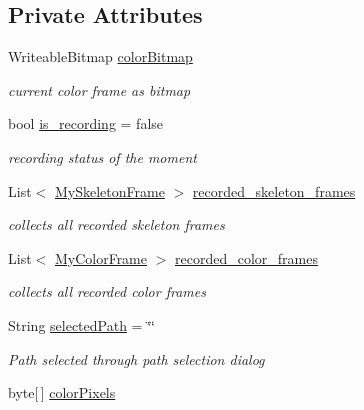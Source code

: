 \subsection*{Private Attributes}
\begin{DoxyCompactItemize}
\item 
Writeable\-Bitmap \hyperlink{classUTKinectSkeletonMovementDetector_1_1MainWindow_a6518d4a9f673ea5af3a052cf1b31043b}{color\-Bitmap}
\begin{DoxyCompactList}\small\item\em current color frame as bitmap \end{DoxyCompactList}\item 
bool \hyperlink{classUTKinectSkeletonMovementDetector_1_1MainWindow_a08ada1dc46136646bf1929a1f685fd5c}{is\-\_\-recording} = false
\begin{DoxyCompactList}\small\item\em recording status of the moment \end{DoxyCompactList}\item 
List$<$ \hyperlink{classUTKinectSkeletonMovementDetector_1_1MySkeletonFrame}{My\-Skeleton\-Frame} $>$ \hyperlink{classUTKinectSkeletonMovementDetector_1_1MainWindow_a09bd035aa72d079cd6bce48085d9a5fa}{recorded\-\_\-skeleton\-\_\-frames}
\begin{DoxyCompactList}\small\item\em collects all recorded skeleton frames \end{DoxyCompactList}\item 
List$<$ \hyperlink{classUTKinectSkeletonMovementDetector_1_1MyColorFrame}{My\-Color\-Frame} $>$ \hyperlink{classUTKinectSkeletonMovementDetector_1_1MainWindow_a43355bd45cd3d523855a791f01fd5c89}{recorded\-\_\-color\-\_\-frames}
\begin{DoxyCompactList}\small\item\em collects all recorded color frames \end{DoxyCompactList}\item 
String \hyperlink{classUTKinectSkeletonMovementDetector_1_1MainWindow_a5f6b2103e33a42b3f88cf7432c42f44a}{selected\-Path} = \char`\"{}\char`\"{}
\begin{DoxyCompactList}\small\item\em Path selected through path selection dialog \end{DoxyCompactList}\item 
byte\mbox{[}$\,$\mbox{]} \hyperlink{classUTKinectSkeletonMovementDetector_1_1MainWindow_a8c2c29bff1f62d8a03e9936f577e44a8}{color\-Pixels}

\end{DoxyCompactItemize}
